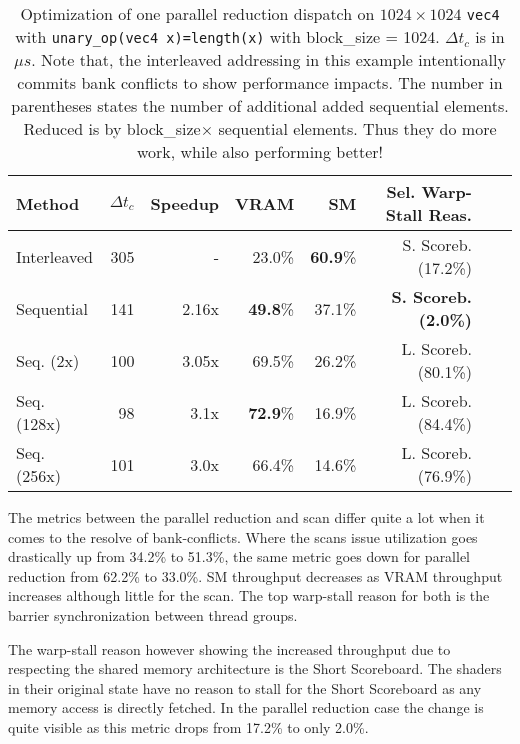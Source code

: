 \documentclass[m,times]{cgMA}
\begin{document}
\begin{table}[htpb]
  \begin{tabular}{ | l | r | r | r | r | r | r | r |}    \hline
    Method         &  $\Delta t_c$ & Speedup &VRAM              & SM              & Sel. Warp-Stall Reas.\\\hline
    Interleaved    & 305                   & -       &23.0\%          & \textbf{60.9}\%  & S. Scoreb.(17.2\%)\\\hline
    Sequential     & 141                   & 2.16x   &\textbf{49.8}\%   & 37.1\%         & \textbf{S. Scoreb.(2.0\%)} \\\hline
    Seq. (2x)      & 100                   & 3.05x   &69.5\%            & 26.2\%         & L. Scoreb.(80.1\%)\\\hline
    Seq. (128x)    & 98                    & 3.1x    &\textbf{72.9}\%   & 16.9\%         & L. Scoreb.(84.4\%)\\\hline
    Seq. (256x)    & 101                   & 3.0x    &66.4\%            & 14.6\%         & L. Scoreb.(76.9\%)\\
    \hline
  \end{tabular}
  \caption{Optimization of one parallel reduction dispatch on $1024\times1024$ \texttt{vec4} with \texttt{unary\_op(vec4 x)=length(x)} with block\_size = 1024. $\Delta t_c$ is in $\mu s$. Note that, the interleaved addressing in this example intentionally commits bank conflicts to show performance impacts. The number in parentheses states the number of additional added sequential elements. Reduced is by block\_size$\times$ sequential elements. Thus they do more work, while also performing better!}\label{tab:map_reduce}
\end{table}

The metrics between the parallel reduction and scan differ quite a lot when it comes to the resolve of bank-conflicts. Where the scans issue utilization goes drastically up from 34.2\% to 51.3\%, the same metric goes down for parallel reduction from 62.2\% to 33.0\%. SM throughput decreases as VRAM throughput increases although little for the scan. The top warp-stall reason for both is the barrier synchronization between thread groups.

The warp-stall reason however showing the increased throughput due to respecting the shared memory architecture is the Short Scoreboard. The shaders in their original state have no reason to stall for the Short Scoreboard as any memory access is directly fetched. In the parallel reduction case the change is quite visible as this metric drops from 17.2\% to only 2.0\%.
\end{document}
